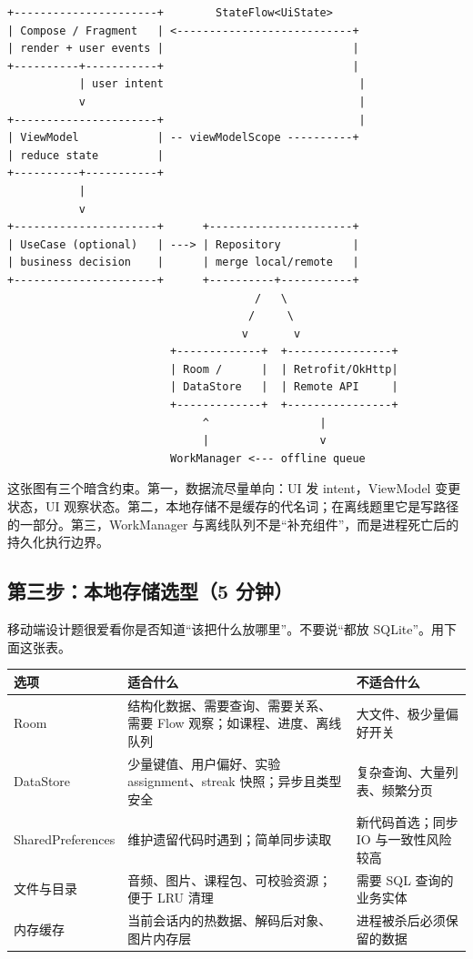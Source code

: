\begin{lstlisting}
+----------------------+        StateFlow<UiState>
| Compose / Fragment   | <---------------------------+
| render + user events |                             |
+----------+-----------+                             |
           | user intent                              |
           v                                          |
+----------------------+                              |
| ViewModel            | -- viewModelScope ----------+
| reduce state         |
+----------+-----------+
           |
           v
+----------------------+      +----------------------+
| UseCase (optional)   | ---> | Repository           |
| business decision    |      | merge local/remote   |
+----------------------+      +----------+-----------+
                                      /   \
                                     /     \
                                    v       v
                         +-------------+  +----------------+
                         | Room /      |  | Retrofit/OkHttp|
                         | DataStore   |  | Remote API     |
                         +-------------+  +----------------+
                              ^                 |
                              |                 v
                         WorkManager <--- offline queue
\end{lstlisting}

这张图有三个暗含约束。第一，数据流尽量单向：UI 发 intent，ViewModel 变更状态，UI 观察状态。第二，本地存储不是缓存的代名词；在离线题里它是写路径的一部分。第三，WorkManager 与离线队列不是“补充组件”，而是进程死亡后的持久化执行边界。

\subsection{第三步：本地存储选型（5 分钟）}

移动端设计题很爱看你是否知道“该把什么放哪里”。不要说“都放 SQLite”。用下面这张表。

\begin{center}
\begin{tabularx}{\textwidth}{p{} X X}
\toprule
选项 & 适合什么 & 不适合什么 \\
\midrule
Room & 结构化数据、需要查询、需要关系、需要 Flow 观察；如课程、进度、离线队列 & 大文件、极少量偏好开关 \\
DataStore & 少量键值、用户偏好、实验 assignment、streak 快照；异步且类型安全 & 复杂查询、大量列表、频繁分页 \\
SharedPreferences & 维护遗留代码时遇到；简单同步读取 & 新代码首选；同步 IO 与一致性风险较高 \\
文件与目录 & 音频、图片、课程包、可校验资源；便于 LRU 清理 & 需要 SQL 查询的业务实体 \\
内存缓存 & 当前会话内的热数据、解码后对象、图片内存层 & 进程被杀后必须保留的数据 \\
\bottomrule
\end{tabularx}
\end{center}

